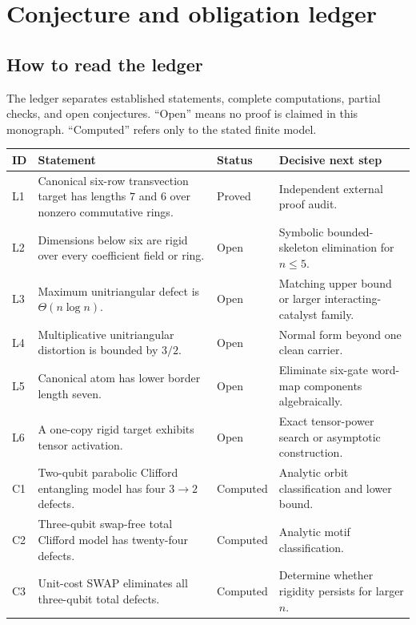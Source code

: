\chapter{Conjecture and obligation ledger}\label{app:ledger}


\section{How to read the ledger}
The ledger separates established statements, complete computations, partial checks, and open conjectures.  ``Open'' means no proof is claimed in this monograph.  ``Computed'' refers only to the stated finite model.

\begin{longtable}{@{}>{\raggedright\arraybackslash}p{}>{\raggedright\arraybackslash}p{}>{\raggedright\arraybackslash}p{}>{\raggedright\arraybackslash}p{}@{}}
\toprule
ID & Statement & Status & Decisive next step\\
\midrule
L1 & Canonical six-row transvection target has lengths $7$ and $6$ over nonzero commutative rings. & Proved & Independent external proof audit.\\
L2 & Dimensions below six are rigid over every coefficient field or ring. & Open & Symbolic bounded-skeleton elimination for $n\le5$.\\
L3 & Maximum unitriangular defect is $\Theta(n\log n)$. & Open & Matching upper bound or larger interacting-catalyst family.\\
L4 & Multiplicative unitriangular distortion is bounded by $3/2$. & Open & Normal form beyond one clean carrier.\\
L5 & Canonical atom has lower border length seven. & Open & Eliminate six-gate word-map components algebraically.\\
L6 & A one-copy rigid target exhibits tensor activation. & Open & Exact tensor-power search or asymptotic construction.\\
C1 & Two-qubit parabolic Clifford entangling model has four $3\to2$ defects. & Computed & Analytic orbit classification and lower bound.\\
C2 & Three-qubit swap-free total Clifford model has twenty-four defects. & Computed & Analytic motif classification.\\
C3 & Unit-cost SWAP eliminates all three-qubit total defects. & Computed & Determine whether rigidity persists for larger $n$.\\

\end{longtable}
